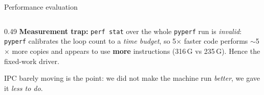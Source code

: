 \documentclass[aspectratio=169,11pt]{beamer}
\newcommand{\down}[1]{\textcolor{bad}{\textbf{#1}}}
\begin{document}
\begin{frame}{Performance evaluation}
\begin{columns}[T]
\begin{column}{0.49\textwidth}
\textcolor{bad}{\textbf{Measurement trap:}} \texttt{perf stat} over the whole
\texttt{pyperf} run is \emph{invalid}: \texttt{pyperf} calibrates the loop
count to a \emph{time budget}, so 5$\times$ faster code performs
$\sim$5$\times$ more copies and appears to use \down{more} instructions
(316\,G vs 235\,G). Hence the fixed-work driver.
\vspace{2pt}

IPC barely moving is the point: we did not make the machine run
\emph{better}, we gave it \emph{less to do}.
\end{column}
\end{columns}
\end{frame}
\end{document}
